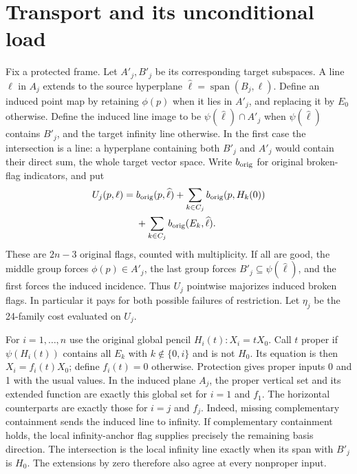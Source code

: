 \documentclass[11pt]{article}
\newcommand{\spanv}{\operatorname{span}}
\begin{document}
\section{Transport and its unconditional load}\label{transport}
Fix a protected frame. Let $A'_j,B'_j$ be its corresponding target
subspaces. A line $\ell$ in $A_j$ extends to the source hyperplane
$\widehat\ell=\spanv(B_j,\ell)$. Define an induced point map by retaining
$\phi(p)$ when it lies in $A'_j$, and replacing it by $E_0$ otherwise.
Define the induced line image to be $\psi(\widehat\ell)\cap A'_j$ when
$\psi(\widehat\ell)$ contains $B'_j$, and the target infinity line
otherwise. In the first case the intersection is a line: a hyperplane
containing both $B'_j$ and $A'_j$ would contain their direct sum, the
whole target vector space.
Write $b_{\rm orig}$ for original broken-flag indicators, and put
\begin{equation}\label{majorant}
\begin{split}
 U_j(p,\ell)={}&b_{\rm orig}(p,\widehat\ell)
 +\sum_{k\in C_j}b_{\rm orig}(p,H_k(0))\\
 &+\sum_{k\in C_j}b_{\rm orig}(E_k,\widehat\ell).
\end{split}
\end{equation}
These are $2n-3$ original flags, counted with multiplicity. If all are
good, the middle group forces $\phi(p)\in A'_j$, the last group forces
$B'_j\subseteq\psi(\widehat\ell)$, and the first forces the induced
incidence. Thus $U_j$ pointwise majorizes induced broken flags. In
particular it pays for both possible failures of restriction. Let
$\eta_j$ be the 24-family cost evaluated on $U_j$.

For $i=1,\ldots,n$ use the original global pencil
$H_i(t):X_i=tX_0$. Call $t$ proper if $\psi(H_i(t))$ contains all $E_k$
with $k\notin\{0,i\}$ and is not $H_0$. Its equation is then
$X_i=f_i(t)X_0$; define $f_i(t)=0$ otherwise. Protection gives proper
inputs 0 and 1 with the usual values. In the induced plane $A_j$, the
proper vertical set and its extended function are exactly this global
set for $i=1$ and $f_1$. The horizontal counterparts are exactly those
for $i=j$ and $f_j$. Indeed, missing complementary containment sends
the induced line to infinity. If complementary containment holds, the
local infinity-anchor flag supplies precisely the remaining basis
direction. The intersection is the local infinity line exactly when
its span with $B'_j$ is $H_0$. The extensions by zero therefore also
agree at every nonproper input.
\end{document}
